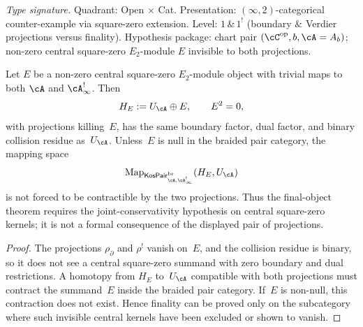 \begin{proposition}
\label{prop:hdm-finality-central-kernel}
\emph{Type signature.} Quadrant: Open $\times$ Cat. Presentation:
$(\infty,2)$-categorical counter-example via square-zero extension.
Level: $1\,\&\,1^!$ (boundary $\&$ Verdier projections versus
finality). Hypothesis package: chart pair
$(\cC^{\mathrm{op}}, b, \cA = A_b)$; non-zero central square-zero
$E_2$-module $E$ invisible to both projections.

Let $E$ be a non-zero central square-zero $E_2$-module object with
trivial maps to both $\cA$ and $\cA^!_\infty$. Then
\[
H_E:=U_\cA\oplus E,\qquad E^2=0,
\]
with projections killing~$E$, has the same boundary factor, dual
factor, and binary collision residue as~$U_\cA$. Unless~$E$ is null in
the braided pair category, the mapping space
\[
\mathrm{Map}_{\mathsf{KosPair}^{\mathrm{br}}_{\cA,\cA^!_\infty}}
(H_E,U_\cA)
\]
is not forced to be contractible by the two projections. Thus the
final-object theorem requires the joint-conservativity hypothesis on
central square-zero kernels; it is not a formal consequence of the
displayed pair of projections.
\end{proposition}

\begin{proof}
The projections $\rho_\partial$ and $\rho^!$ vanish on~$E$, and the
collision residue is binary, so it does not see a central square-zero
summand with zero boundary and dual restrictions. A homotopy from
$H_E$ to~$U_\cA$ compatible with both projections must contract the
summand~$E$ inside the braided pair category. If~$E$ is non-null, this
contraction does not exist. Hence finality can be proved only on the
subcategory where such invisible central kernels have been excluded or
shown to vanish.
\end{proof}

